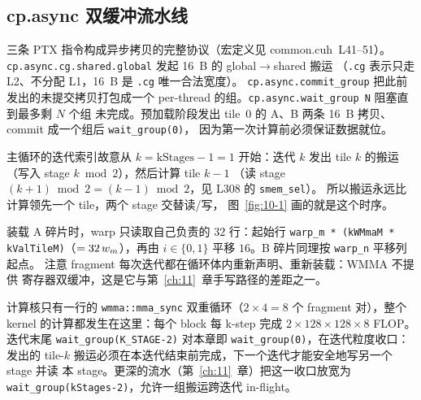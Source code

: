 \subsection{cp.async 双缓冲流水线}



三条 PTX 指令构成异步拷贝的完整协议（宏定义见 common.cuh~L41--51）。
\texttt{cp.\allowbreak{}async.\allowbreak{}cg.\allowbreak{}shared.\allowbreak{}global} 发起 16~B 的 global$\to$shared 搬运
（\texttt{.cg} 表示只走 L2、不分配 L1，16~B 是 \texttt{.cg} 唯一合法宽度）。
\texttt{cp.\allowbreak{}async.\allowbreak{}commit\_\allowbreak{}group} 把此前发出的未提交拷贝打包成一个
per-thread 的组。\texttt{cp.\allowbreak{}async.\allowbreak{}wait\_\allowbreak{}group N} 阻塞直到最多剩 $N$ 个组
未完成。预加载阶段发出 tile~0 的 A、B 两条 16~B 拷贝、commit 成一个组后 \texttt{wait\_\allowbreak{}group\allowbreak{}(0)}，
因为第一次计算前必须保证数据就位。



主循环的迭代索引故意从 $k = \mathrm{kStages}-1 = 1$ 开始：迭代 $k$ 发出
tile $k$ 的搬运（写入 stage $k \bmod 2$），然后计算 tile $k-1$
（读 stage $(k+1)\bmod 2 = (k-1)\bmod 2$，见 L308 的 \texttt{smem\_sel}）。
所以搬运永远比计算领先一个 tile，两个 stage 交替读/写，
图~\ref{fig:10-1} 画的就是这个时序。



装载 A 碎片时，warp 只读取自己负责的 $32$ 行：起始行
\texttt{warp\_\allowbreak{}m * \allowbreak{}(kWMmaM * kValTileM)}（$=32\,w\sb m$），再由
$i\in\{0,1\}$ 平移 $16$。B 碎片同理按 \texttt{warp\_n} 平移列起点。
注意 fragment 每次迭代都在循环体内重新声明、重新装载：WMMA 不提供
寄存器双缓冲，这是它与第~\ref{ch:11}~章手写路径的差距之一。



计算核只有一行的 \texttt{wmma::\allowbreak{}mma\_\allowbreak{}sync} 双重循环（$2\times4=8$ 个
fragment 对），整个 kernel 的计算都发生在这里：每个 block 每 k-step 完成
$2\times128\times128\times8$ FLOP。迭代末尾 \texttt{wait\_\allowbreak{}group\allowbreak{}(K\_\allowbreak{}STAGE-2)}
对本章即 \texttt{wait\_\allowbreak{}group\allowbreak{}(0)}，在迭代粒度收口：发出的 tile-$k$
搬运必须在本迭代结束前完成，下一个迭代才能安全地写另一个 stage 并读
本 stage。更深的流水（第~\ref{ch:11}~章）把这一收口放宽为
\texttt{wait\_\allowbreak{}group\allowbreak{}(k\allowbreak{}Stages-2)}，允许一组搬运跨迭代 in-flight。

